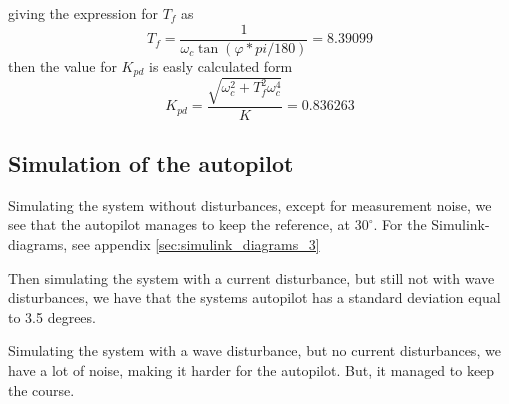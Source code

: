 giving the expression for $T_f$ as
\begin{equation}
    T_f = \frac{1}{\omega_c\tan(\varphi*pi/180)}= 8.39099 
\end{equation}
then the value for $K_{pd}$ is easly calculated form 
\begin{equation}
    K_{pd} = \frac{\sqrt{\omega_c^2 + T_f^2 \omega_c^4}}{K}= 0.836263
\end{equation}










\subsection{Simulation of the autopilot}
Simulating the system without disturbances, except for measurement noise, we see that the autopilot manages to keep the reference, at $30^\circ$. For the Simulink- diagrams, see appendix \ref{sec:simulink_diagrams_3}




Then simulating the system with a current disturbance, but still not with wave disturbances, we have that the systems autopilot has a standard deviation equal to 3.5 degrees.



Simulating the system with a wave disturbance, but no current disturbances, we have a lot of noise, making it harder for the autopilot. But, it managed to keep the course. 


\bigskip

